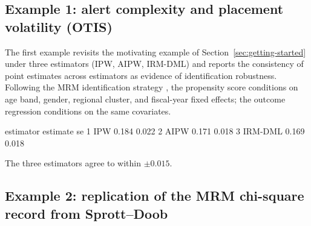 \documentclass[article,shortnames,nojss]{jss}
\newcommand{\OTIS}{\textsf{OTIS}}
\begin{document}
\subsection[Example 1: alert complexity and placement volatility (OTIS)]{Example 1: alert complexity and placement volatility (\OTIS{})}

The first example revisits the motivating example of
Section~\ref{sec:getting-started} under three estimators
(IPW, AIPW, IRM-DML) and reports the consistency of point
estimates across estimators as evidence of identification
robustness. Following the MRM identification strategy
\citep{Ruhela2026MRM}, the propensity score conditions on age band,
gender, regional cluster, and fiscal-year fixed effects; the
outcome regression conditions on the same covariates.


\begin{Code}
  estimator  estimate     se
1       IPW     0.184  0.022
2      AIPW     0.171  0.018
3   IRM-DML     0.169  0.018
\end{Code}

The three estimators agree to within $$.

\subsection{Example 2: replication of the MRM chi-square record from Sprott--Doob}
\end{document}
